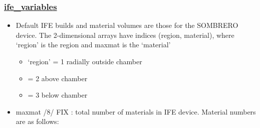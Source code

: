 \documentclass[]{article}
\providecommand{\tightlist}{%
  \setlength{\itemsep}{0pt}\setlength{\parskip}{0pt}}
\begin{document}
\subsubsection{\texorpdfstring{\href{ife_variables.html}{ife\_variables}}{ife\_variables}}\label{ife_variables}

\begin{itemize}
\tightlist
\item
  Default IFE builds and material volumes are those for the SOMBRERO
  device. The 2-dimensional arrays have indices (region, material),
  where `region' is the region and maxmat is the `material'

  \begin{itemize}
  \tightlist
  \item
    `region' = 1 radially outside chamber
  \item
    = 2 above chamber
  \item
    = 3 below chamber
  \end{itemize}
\item
  maxmat /8/ FIX : total number of materials in IFE device. Material
  numbers are as follows:


\end{itemize}
\end{document}
